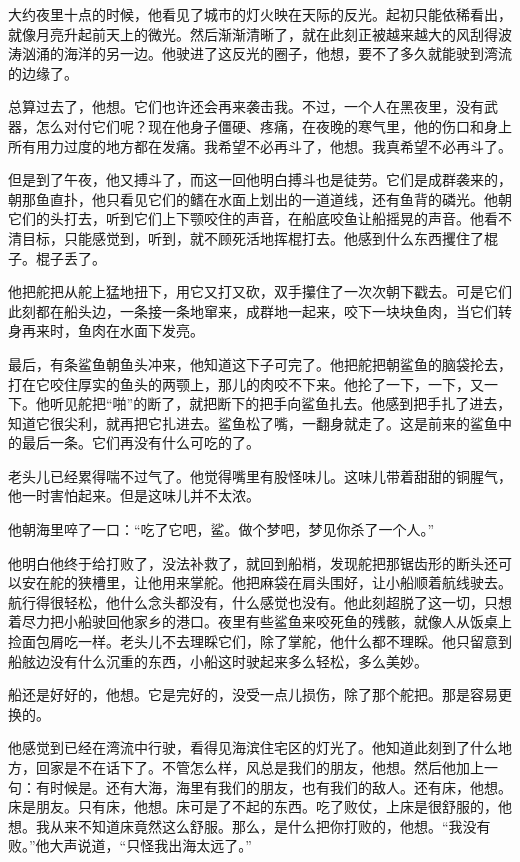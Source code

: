 \documentclass[12pt,UTF-8,openany]{ctexbook}
\begin{document}
\begin{normalsize}
    大约夜里十点的时候，他看见了城市的灯火映在天际的反光。起初只能依稀看出，就像月亮升起前天上的微光。然后渐渐清晰了，就在此刻正被越来越大的风刮得波涛汹涌的海洋的另一边。他驶进了这反光的圈子，他想，要不了多久就能驶到湾流的边缘了。
    
    总算过去了，他想。它们也许还会再来袭击我。不过，一个人在黑夜里，没有武器，怎么对付它们呢？现在他身子僵硬、疼痛，在夜晚的寒气里，他的伤口和身上所有用力过度的地方都在发痛。我希望不必再斗了，他想。我真希望不必再斗了。
    
    但是到了午夜，他又搏斗了，而这一回他明白搏斗也是徒劳。它们是成群袭来的，朝那鱼直扑，他只看见它们的鳍在水面上划出的一道道线，还有鱼背的磷光。他朝它们的头打去，听到它们上下颚咬住的声音，在船底咬鱼让船摇晃的声音。他看不清目标，只能感觉到，听到，就不顾死活地挥棍打去。他感到什么东西攫住了棍子。棍子丢了。
    
    他把舵把从舵上猛地扭下，用它又打又砍，双手攥住了一次次朝下戳去。可是它们此刻都在船头边，一条接一条地窜来，成群地一起来，咬下一块块鱼肉，当它们转身再来时，鱼肉在水面下发亮。
    
    最后，有条鲨鱼朝鱼头冲来，他知道这下子可完了。他把舵把朝鲨鱼的脑袋抡去，打在它咬住厚实的鱼头的两颚上，那儿的肉咬不下来。他抡了一下，一下，又一下。他听见舵把“啪”的断了，就把断下的把手向鲨鱼扎去。他感到把手扎了进去，知道它很尖利，就再把它扎进去。鲨鱼松了嘴，一翻身就走了。这是前来的鲨鱼中的最后一条。它们再没有什么可吃的了。
    
    老头儿已经累得喘不过气了。他觉得嘴里有股怪味儿。这味儿带着甜甜的铜腥气，他一时害怕起来。但是这味儿并不太浓。
    
    他朝海里啐了一口：“吃了它吧，鲨。做个梦吧，梦见你杀了一个人。”
    
    他明白他终于给打败了，没法补救了，就回到船梢，发现舵把那锯齿形的断头还可以安在舵的狭槽里，让他用来掌舵。他把麻袋在肩头围好，让小船顺着航线驶去。航行得很轻松，他什么念头都没有，什么感觉也没有。他此刻超脱了这一切，只想着尽力把小船驶回他家乡的港口。夜里有些鲨鱼来咬死鱼的残骸，就像人从饭桌上捡面包屑吃一样。老头儿不去理睬它们，除了掌舵，他什么都不理睬。他只留意到船舷边没有什么沉重的东西，小船这时驶起来多么轻松，多么美妙。
    
    船还是好好的，他想。它是完好的，没受一点儿损伤，除了那个舵把。那是容易更换的。
    
    他感觉到已经在湾流中行驶，看得见海滨住宅区的灯光了。他知道此刻到了什么地方，回家是不在话下了。不管怎么样，风总是我们的朋友，他想。然后他加上一句：有时候是。还有大海，海里有我们的朋友，也有我们的敌人。还有床，他想。床是朋友。只有床，他想。床可是了不起的东西。吃了败仗，上床是很舒服的，他想。我从来不知道床竟然这么舒服。那么，是什么把你打败的，他想。“我没有败。”他大声说道，“只怪我出海太远了。”
    

\end{normalsize}
\end{document}
